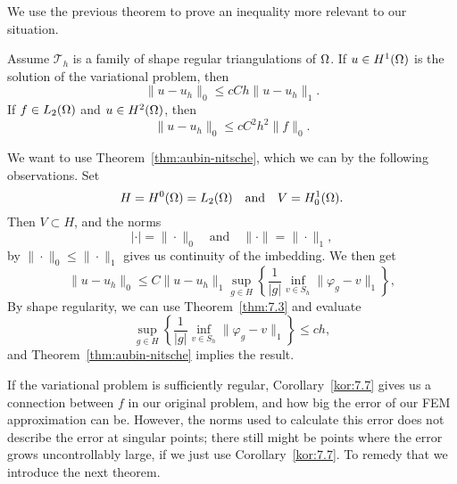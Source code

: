 We use the previous theorem to prove an inequality more relevant to our situation.
\begin{kor}{\quad\label{kor:7.7}}
   Assume $\mathcal{T}_h$ is a family of shape regular triangulations of $\Omega$.
   If $u\in H^1(\Omega)$ is the solution of the variational problem, then 
   \begin{equation*}
    \|u-u_h\|_0 \leq cCh \|u-u_h\|_1.
   \end{equation*}
   If $f\in L_2(\Omega)$ and $u\in H^2(\Omega)$, then 
   \begin{equation*}
    \|u-u_h\|_0 \leq cC^2h^2 \|f\|_0.
   \end{equation*}
\end{kor}
\begin{bev}
   We want to use Theorem~\ref{thm:aubin-nitsche}, which we can by 
   the following observations. Set 
    \begin{equation*}
        H = H^0(\Omega)=L_2(\Omega) \quad \text{and} \quad V = H^1_0(\Omega).
    \end{equation*}
    Then $V \subset H$, and the norms 
    \begin{equation*}
        |\cdot| = \|\cdot\|_0 \quad \text{and} \quad \|\cdot\| = \|\cdot\|_1,
    \end{equation*}
    by $\|\cdot\|_0 \leq \|\cdot\|_1$ gives us continuity of the imbedding.
    We then get
    \begin{equation*}
        \|u-u_h\|_0 \leq C \|u-u_h\|_1 \sup_{g\in H} \left \{ \frac{1}{|g|} \inf_{v \in S_h} \|\varphi_g - v\|_1 \right \},
    \end{equation*}
    By shape regularity, we can use Theorem~\ref{thm:7.3} and evaluate 
    \begin{equation*}
        \sup_{g\in H} \left \{ \frac{1}{|g|} \inf_{v \in S_h} \|\varphi_g - v\|_1 \right \}
        \leq ch,
    \end{equation*}
    and Theorem~\ref{thm:aubin-nitsche} implies the result.
\end{bev}
If the variational problem is sufficiently regular,
Corollary~\ref{kor:7.7} gives us a connection between $f$ in our original problem, 
and how big the error of our FEM approximation can be. 
However, the norms used to calculate this error does not describe the error at singular points; there still might be points where the error grows uncontrollably large, 
if we just use Corollary~\ref{kor:7.7}. 
To remedy that we introduce the next theorem. 